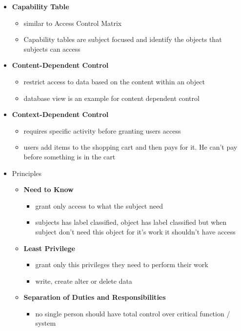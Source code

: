 \documentclass[11pt,twoside,landscape]{article}
\begin{document}
\begin{multicols}{4}
\begin{itemize}
\begin{itemize}
\item \textbf{Capability Table}
\begin{itemize}
\item similar to Access Control Matrix
\item Capability tables are subject focused and identify the objects that subjects can access
\end{itemize}

\item \textbf{Content-Dependent Control}
\begin{itemize}
\item restrict access to data based on the content within an object
\item database view is an example for content dependent control
\end{itemize}

\item \textbf{Context-Dependent Control}
\begin{itemize}
\item requires specific activity before granting users access
\item users add items to the shopping cart and then pays for it. He can't pay before something is in the cart
\end{itemize}
\end{itemize}
\end{itemize}


\begin{itemize}
\item Principles
\begin{itemize}
\item \textbf{Need to Know}
\begin{itemize}
\item grant only access to what the subject need
\item subjects has label classified, object has label classified but when subject don't need this object for it's work it shouldn't have access
\end{itemize}

\item \textbf{Least Privilege}
\begin{itemize}
\item grant only this privileges they need to perform their work
\item write, create alter or delete data
\end{itemize}

\item \textbf{Separation of Duties and Responsibilities}
\begin{itemize}
\item no single person should have total control over critical function / system
\end{itemize}
\end{itemize}
\end{itemize}


\end{multicols}
\end{document}
